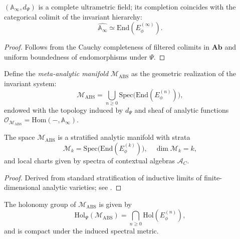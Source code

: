 \begin{lemma}\label{lem:complete}
$(\mathbb{A}_\infty,d_\Psi)$ is a complete ultrametric field; its completion coincides with the categorical colimit of the invariant hierarchy:
\[
\widehat{\mathbb{A}_\infty}
\simeq
\mathrm{End}(E_\phi^{(\infty)}).
\]
\end{lemma}

\begin{proof}
Follows from the Cauchy completeness of filtered colimits in $\mathbf{Ab}$ and uniform boundedness of endomorphisms under $\Psi$. \relax
\end{proof}


\begin{definition}\label{def:functorial-manifold}
Define the \emph{meta-analytic manifold} $\mathcal M_{\mathrm{ABS}}$ as the geometric realization of the invariant system:
\[
\mathcal M_{\mathrm{ABS}}
=\bigcup_{n\ge0}\mathrm{Spec}\big(\mathrm{End}(E_\phi^{(n)})\big),
\]
endowed with the topology induced by $d_\Psi$ and sheaf of analytic functions
$\mathcal{O}_{\mathcal M_{\mathrm{ABS}}}=\mathrm{Hom}(-,\mathbb{A}_\infty)$.
\end{definition}

\begin{theorem}\label{thm:smoothness}
The space $\mathcal M_{\mathrm{ABS}}$ is a stratified analytic manifold with strata
\[
\mathcal M_k
=\mathrm{Spec}\big(\mathrm{End}(E_\phi^{(k)})\big),
\quad
\dim\mathcal M_k=k,
\]
and local charts given by spectra of contextual algebras $\mathcal{A}_C$.
\end{theorem}

\begin{proof}
Derived from standard stratification of inductive limits of finite-dimensional analytic varieties; see \cite{Hironaka1975,Whitney1965}. \relax
\end{proof}

\begin{corollary}\label{cor:meta-holonomy}
The holonomy group of $\mathcal M_{\mathrm{ABS}}$ is given by
\[
\mathrm{Hol}_{\Psi}(\mathcal M_{\mathrm{ABS}})=
\bigcap_{n\ge0}\mathrm{Hol}(E_\phi^{(n)}),
\]
and is compact under the induced spectral metric.
\end{corollary}

